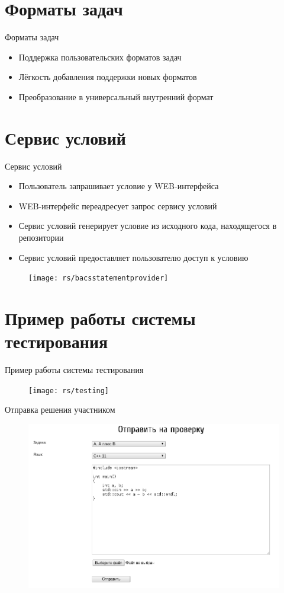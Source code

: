 \documentclass[xetex,mathserif,serif,10pt]{beamer}
\newenvironment{sframe}[2]{\section{#1}\begin{frame}[label=#2]{#1}}{\end{frame}}
\begin{document}
    \begin{sframe}{Форматы задач}{bacsproblem}
        \begin{itemize}
            \item Поддержка пользовательских форматов задач
            \item Лёгкость добавления поддержки новых форматов
            \item Преобразование в универсальный внутренний формат
        \end{itemize}
    \end{sframe}

    \begin{sframe}{Сервис условий}{bacsstatementprovider}
        \begin{itemize}
            \item Пользователь запрашивает условие у WEB-интерфейса
            \item WEB-интерфейс переадресует запрос сервису условий
            \item Сервис условий генерирует условие из исходного кода,
                находящегося в репозитории
            \item Сервис условий предоставляет пользователю доступ к условию
        \end{itemize}
        \begin{figure}
            \centering
            \texttt{[image: rs/bacsstatementprovider]}
        \end{figure}
    \end{sframe}

    \begin{sframe}{Пример работы системы тестирования}{testing}
        \begin{figure}
            \centering
            \texttt{[image: rs/testing]}
        \end{figure}
    \end{sframe}

    \begin{frame}{Отправка решения участником}
        \begin{figure}
            \centering
            \includegraphics[width=\columnwidth]{rs/sendsubmitok}
        \end{figure}
    \end{frame}
\end{document}
